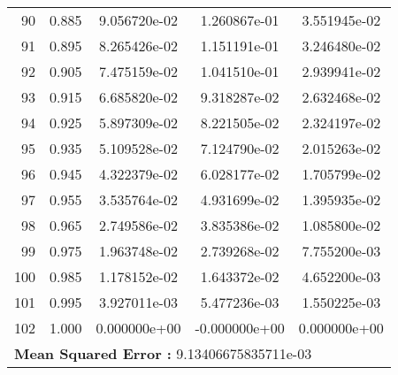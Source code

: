 \begin{table}[ht]
\begin{tabular}{rcccc}
    90 &  0.885 &    9.056720e-02 &    1.260867e-01  &     3.551945e-02\\ 
    91 &  0.895 &    8.265426e-02 &    1.151191e-01  &     3.246480e-02\\ 
    92 &  0.905 &    7.475159e-02 &    1.041510e-01  &     2.939941e-02\\ 
    93 &  0.915 &    6.685820e-02 &    9.318287e-02  &     2.632468e-02\\ 
    94 &  0.925 &    5.897309e-02 &    8.221505e-02  &     2.324197e-02\\ 
    95 &  0.935 &    5.109528e-02 &    7.124790e-02  &     2.015263e-02\\ 
    96 &  0.945 &    4.322379e-02 &    6.028177e-02  &     1.705799e-02\\ 
    97 &  0.955 &    3.535764e-02 &    4.931699e-02  &     1.395935e-02\\ 
    98 &  0.965 &    2.749586e-02 &    3.835386e-02  &     1.085800e-02\\ 
    99 &  0.975 &    1.963748e-02 &    2.739268e-02  &     7.755200e-03\\ 
    100 &  0.985 &    1.178152e-02 &    1.643372e-02  &     4.652200e-03\\ 
    101 &  0.995 &    3.927011e-03 &    5.477236e-03  &     1.550225e-03\\ 
    102 &  1.000 &    0.000000e+00 &   -0.000000e+00  &     0.000000e+00\\ 
    \hline
     \multicolumn{5}{l}{\textbf{Mean Squared Error :} 9.13406675835711e-03}\\ 
  \end{tabular}
  \label{lbl:tabloExmp2_test}
\end{table}
